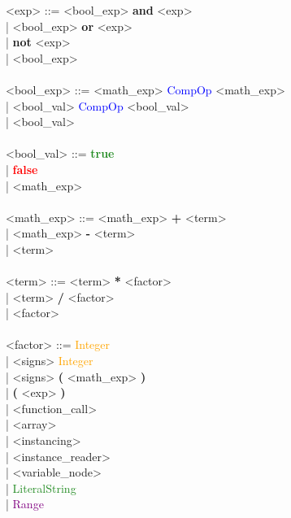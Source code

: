 \documentclass{Dokumentmall}
\begin{document}
\begin{tabbing}
  \><exp> \>::= \><bool\_exp> \textbf{and} <exp>\\
  \> \>| \> <bool\_exp> \textbf{or} <exp>\\
  \> \>| \> \textbf{not} <exp>\\
  \> \>| \> <bool\_exp>\\\\

  \><bool\_exp> \>::= \><math\_exp> \textcolor{blue}{CompOp} <math\_exp>\\
  \> \>| \> <bool\_val> \textcolor{blue}{CompOp} <bool\_val>\\
  \> \>| \> <bool\_val>\\\\

  \><bool\_val> \>::= \>\textbf{\textcolor{ForestGreen}{true}}\\
  \> \>| \> \textbf{\textcolor{red}{false}}\\
  \> \>| \> <math\_exp>\\\\

  \><math\_exp> \>::= \><math\_exp> \textbf{+} <term>\\
  \> \>| \> <math\_exp> \textbf{-} <term>\\
  \> \>| \> <term>\\\\

  \><term> \>::= \><term> \textbf{*} <factor>\\
  \> \>| \> <term> \textbf{/} <factor>\\
  \> \>| \> <factor>\\\\

  \><factor> \>::= \>\textcolor{orange}{Integer} \\
  \> \>| \> <signs> \textcolor{orange}{Integer}\\
  \> \>| \> <signs> \textbf{(} <math\_exp> \textbf{)}\\
  \> \>| \> \textbf{(} <exp> \textbf{)}\\
  \> \>| \> <function\_call>\\
  \> \>| \> <array>\\
  \> \>| \> <instancing>\\
  \> \>| \> <instance\_reader>\\
  \> \>| \> <variable\_node>\\
  \> \>| \> \textcolor{ForestGreen}{LiteralString}\\
  \> \>| \> \textcolor{Purple}{Range}\\\\


\end{tabbing}
\end{document}
